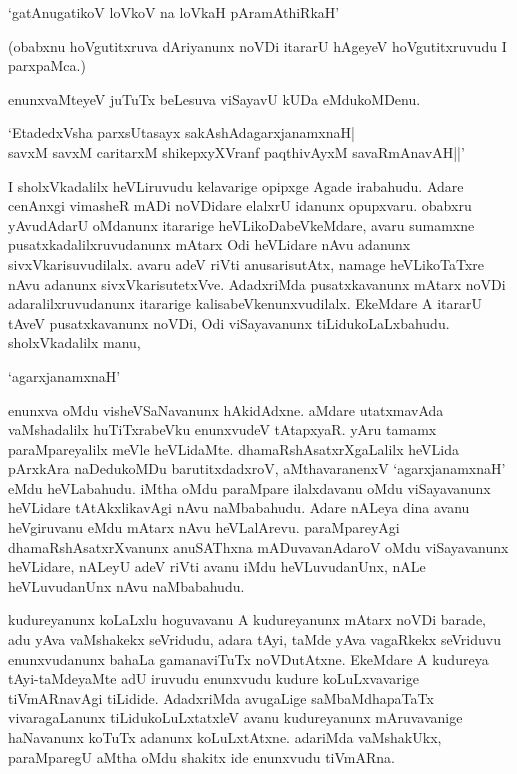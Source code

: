 \begin{shloka} 
`gatAnugatikoV loVkoV na loVkaH pAramAthiRkaH'
\end{shloka}

(obabxnu hoVgutitxruva dAriyanunx noVDi itararU hAgeyeV hoVgutitxruvudu I parxpaMca.)

enunxvaMteyeV juTuTx beLesuva viSayavU kUDa eMdukoMDenu. 

\begin{shloka}
`EtadedxVsha parxsUtasayx sakAshAdagarxjanamxnaH|\\
savxM savxM caritarxM shikepxyXVranf paqthivAyxM savaRmAnavAH||'
\end{shloka}

I sholxVkadalilx heVLiruvudu kelavarige opipxge Agade irabahudu. Adare cenAnxgi vimasheR mADi noVDidare elalxrU idanunx opupxvaru. obabxru yAvudAdarU oMdanunx itararige heVLikoDabeVkeMdare, avaru sumamxne pusatxkadalilxruvudanunx mAtarx Odi heVLidare nAvu adanunx sivxVkarisuvudilalx. avaru adeV riVti anusarisutAtx, namage heVLikoTaTxre nAvu adanunx sivxVkarisutetxVve. AdadxriMda pusatxkavanunx mAtarx noVDi adaralilxruvudanunx itararige kalisabeVkenunxvudilalx. EkeMdare A itararU tAveV pusatxkavanunx noVDi, Odi viSayavanunx tiLidukoLaLxbahudu. sholxVkadalilx manu, 

\begin{shloka}
`agarxjanamxnaH'
\end{shloka}
 
enunxva oMdu visheVSaNavanunx hAkidAdxne. aMdare utatxmavAda vaMshadalilx huTiTxrabeVku enunxvudeV tAtapxyaR. yAru tamamx paraMpareyalilx meVle heVLidaMte. dhamaRshAsatxrXgaLalilx heVLida pArxkAra naDedukoMDu barutitxdadxroV, aMthavaranenxV `agarxjanamxnaH' eMdu heVLabahudu. iMtha oMdu paraMpare ilalxdavanu oMdu viSayavanunx heVLidare tAtAkxlikavAgi nAvu naMbabahudu. Adare nALeya dina avanu heVgiruvanu eMdu mAtarx nAvu heVLalArevu. paraMpareyAgi dhamaRshAsatxrXvanunx anuSAThxna mADuvavanAdaroV oMdu viSayavanunx heVLidare, nALeyU adeV riVti avanu iMdu heVLuvudanUnx, nALe heVLuvudanUnx nAvu naMbabahudu.

kudureyanunx koLaLxlu hoguvavanu A kudureyanunx mAtarx noVDi barade, adu yAva vaMshakekx seVridudu, adara tAyi, taMde yAva vagaRkekx seVriduvu enunxvudanunx bahaLa gamanaviTuTx noVDutAtxne. EkeMdare A kudureya tAyi-taMdeyaMte adU iruvudu enunxvudu kudure koLuLxvavarige tiVmARnavAgi tiLidide. AdadxriMda avugaLige saMbaMdhapaTaTx vivaragaLanunx tiLidukoLuLxtatxleV avanu kudureyanunx mAruvavanige haNavanunx koTuTx adanunx koLuLxtAtxne. adariMda vaMshakUkx, paraMparegU aMtha oMdu shakitx ide enunxvudu tiVmARna.

